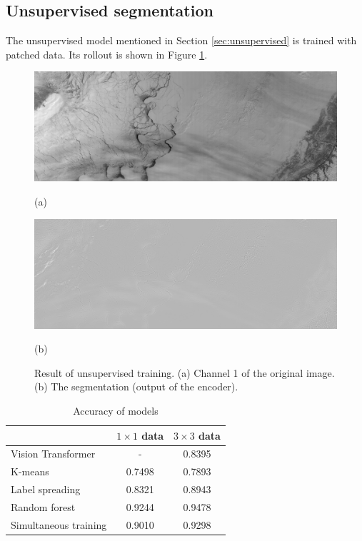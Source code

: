 \documentclass{article}
\begin{document}
    \subsection{Unsupervised segmentation}
        The unsupervised model mentioned in Section \ref{sec:unsupervised}
        is trained with patched data.
        Its rollout is shown in Figure \ref{fig:unsupervised}.

        \begin{figure}[ht]
            \centering
            \begin{minipage}{0.49\hsize}
                \centering
                \includegraphics[width = 1\hsize]{1.png}
                \caption*{(a)}
            \end{minipage}
            \begin{minipage}{0.49\hsize}
                \centering
                \includegraphics[width = 1\hsize]{1_unsupervised.png}
                \caption*{(b)}
            \end{minipage}
            \caption{
                Result of unsupervised training.
                (a) Channel 1 of the original image.
                (b) The segmentation (output of the encoder).
            }
            \label{fig:unsupervised}
        \end{figure}

    \begin{table}
        \centering
        \caption{Accuracy of models}
        \label{tab:accuracy}
        \begin{tabular}{l|cc} \hline
            & $1\times 1$ data & $3\times 3$ data \\ \hline
            Vision Transformer & - & 0.8395 \\
            K-means & 0.7498 & 0.7893 \\
            Label spreading & 0.8321 & 0.8943 \\
            Random forest & 0.9244 & 0.9478 \\
            Simultaneous training & 0.9010 & 0.9298 \\ \hline
        \end{tabular}
    \end{table}
\end{document}
